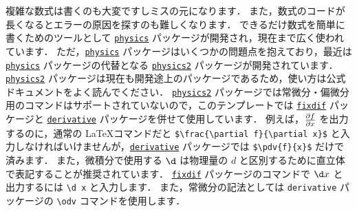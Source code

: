 \documentclass[
    paper=a4paper,      %
    article,            %
    fontsize=11pt,      %
    jafontsize=11pt,    %
    head_space=25mm,    %
    foot_space=25mm,    %
    gutter=20mm,        %
    fore-edge=20mm      %
    ]{jlreq}            %
\begin{document}
複雑な数式は書くのも大変ですしミスの元になります．
また，数式のコードが長くなるとエラーの原因を探すのも難しくなります．
できるだけ数式を簡単に書くためのツールとして \href{https://ctan.org/pkg/physics}{\texttt{physics}} パッケージが開発され，現在まで広く使われています．
ただ，\href{https://ctan.org/pkg/physics}{\texttt{physics}} パッケージはいくつかの問題点を抱えており，最近は \href{https://ctan.org/pkg/physics}{\texttt{physics}} パッケージの代替となる \href{https://ctan.org/pkg/physics2}{\texttt{physics2}} パッケージが開発されています．
\href{https://ctan.org/pkg/physics2}{\texttt{physics2}} パッケージは現在も開発途上のパッケージであるため，使い方は公式ドキュメントをよく読んでください．
\href{https://ctan.org/pkg/physics2}{\texttt{physics2}} パッケージでは常微分・偏微分用のコマンドはサポートされていないので，このテンプレートでは \href{https://ctan.org/pkg/fixdif}{\texttt{fixdif}} パッケージと \href{https://ctan.org/pkg/derivative}{\texttt{derivative}} パッケージを併せて使用しています．
例えば，$\pdv{f}{x}$ を出力するのに，通常の \LaTeX コマンドだと \verb|$\frac{\partial f}{\partial x}$| と入力しなければいけませんが，\href{https://ctan.org/pkg/derivative}{\texttt{derivative}} パッケージでは \verb|$\pdv{f}{x}$| だけで済みます．
また，微積分で使用する $\d$ は物理量の $d$ と区別するために直立体で表記することが推奨されています．
\href{https://ctan.org/pkg/fixdif}{\texttt{fixdif}} パッケージのコマンドで $\d x$ と出力するには \verb|\d x| と入力します．
また，常微分の記法としては \verb|derivative| パッケージの \verb|\odv| コマンドを使用します．





% 
% 
\end{document}
